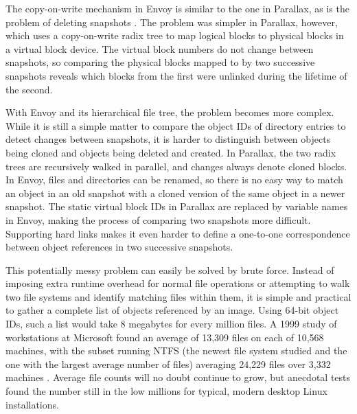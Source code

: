 The copy-on-write mechanism in Envoy is similar to the one in Parallax, as is the problem of deleting snapshots \cite{warfield}. The problem was simpler in Parallax, however, which uses a copy-on-write radix tree to map logical blocks to physical blocks in a virtual block device. The virtual block numbers do not change between snapshots, so comparing the physical blocks mapped to by two successive snapshots reveals which blocks from the first were unlinked during the lifetime of the second.

With Envoy and its hierarchical file tree, the problem becomes more complex. While it is still a simple matter to compare the object IDs of directory entries to detect changes between snapshots, it is harder to distinguish between objects being cloned and objects being deleted and created. In Parallax, the two radix trees are recursively walked in parallel, and changes always denote cloned blocks. In Envoy, files and directories can be renamed, so there is no easy way to match an object in an old snapshot with a cloned version of the same object in a newer snapshot. The static virtual block IDs in Parallax are replaced by variable names in Envoy, making the process of comparing two snapshots more difficult. Supporting hard links makes it even harder to define a one-to-one correspondence between object references in two successive snapshots.

This potentially messy problem can easily be solved by brute force. Instead of imposing extra runtime overhead for normal file operations or attempting to walk two file systems and identify matching files within them, it is simple and practical to gather a complete list of objects referenced by an image. Using 64-bit object IDs, such a list would take 8 megabytes for every million files. A 1999 study of workstations at Microsoft found an average of 13,309 files on each of 10,568 machines, with the subset running NTFS (the newest file system studied and the one with the largest average number of files) averaging 24,229 files over 3,332 machines \cite{douceur99}. Average file counts will no doubt continue to grow, but anecdotal tests found the number still in the low millions for typical, modern desktop Linux installations.

